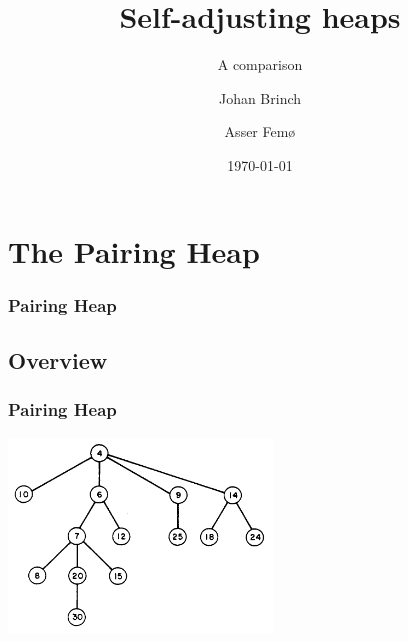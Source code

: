 \documentclass{beamer}
\title{Self-adjusting heaps}
\subtitle{A comparison}
\author{Johan Brinch \and Asser Femø}
\date{\today}
\begin{document}
\lstset{basicstyle=\footnotesize\ttfamily}
\begin{frame}
  \titlepage
\end{frame}

\section{The Pairing Heap}

\begin{frame}[fragile]
\frametitle{Pairing Heap}
\tableofcontents
\end{frame}

\subsection{Overview}
\begin{frame}[fragile]
\frametitle{Pairing Heap}

\begin{center}
\includegraphics[width=7cm]{../pairing-heap-slides/fig1.png}
\end{center}

\end{frame}
\end{document}
